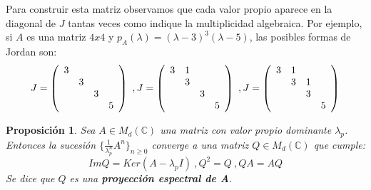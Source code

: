 \documentclass[size=a4, parskip=half, titlepage=false, toc=flat, toc=bib, 12pt]{scrartcl}
\theoremstyle{theorem-style}
\newtheorem{nprop}{Proposición}[section]
\theoremstyle{definition-style}
\theoremstyle{remark-style}
\theoremstyle{example-style}
\theoremstyle{definition-style}
\theoremstyle{remark-style}
\begin{document}
Para construir esta matriz observamos que cada valor propio aparece en la diagonal de $J$ tantas veces como indique la multiplicidad algebraica. Por ejemplo, si $A$ es una matriz $4x4$ y $p_A(\lambda) = (\lambda - 3)^3 (\lambda - 5)$, las posibles formas de Jordan son:
$$J = \left(
      \begin{array}{{cccc}}
        3   &           &         &     \\
              &    3    &         &     \\
              &         & 3       &     \\
              &        &         & 5
      \end{array}
\right) \ ,  J = \left(
      \begin{array}{{cccc}}
        3   &    1      &         &     \\
            &    3      &         &     \\
            &           & 3       &     \\
            &           &         & 5
      \end{array}
\right)\ , J = \left(
      \begin{array}{{cccc}}
        3     &     1     &         &     \\
              &    3      &   1     &     \\
              &           & 3       &     \\
              &           &         & 5
      \end{array}
\right) $$

\begin{nprop} Sea $A \in M_d(\mathbb{C})$ una matriz con valor propio dominante $\lambda_p$. Entonces la sucesión $\{\frac{1}{ \lambda_p^n } A^n \}_{n\geq 0}$ converge a una matriz $Q \in M_d(\mathbb{C})$ que cumple:
$$ImQ = Ker ( A - \lambda_p I) \ , Q^2 = Q \ , QA = AQ $$
Se dice que $Q$ es una \textbf{proyección espectral de A}.
\end{nprop}
\end{document}
